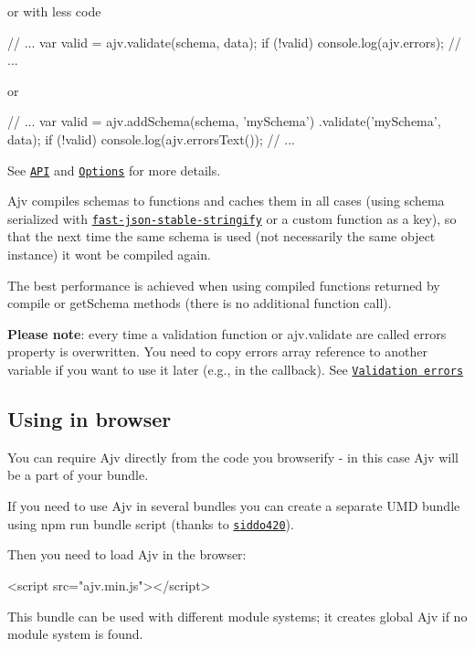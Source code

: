 or with less code


\begin{DoxyCode}
// ...
var valid = ajv.validate(schema, data);
if (!valid) console.log(ajv.errors);
// ...
\end{DoxyCode}


or


\begin{DoxyCode}
// ...
var valid = ajv.addSchema(schema, 'mySchema')
               .validate('mySchema', data);
if (!valid) console.log(ajv.errorsText());
// ...
\end{DoxyCode}


See \href{#api}{\tt A\+PI} and \href{#options}{\tt Options} for more details.

Ajv compiles schemas to functions and caches them in all cases (using schema serialized with \href{https://github.com/epoberezkin/fast-json-stable-stringify}{\tt fast-\/json-\/stable-\/stringify} or a custom function as a key), so that the next time the same schema is used (not necessarily the same object instance) it won\textquotesingle{}t be compiled again.

The best performance is achieved when using compiled functions returned by {\ttfamily compile} or {\ttfamily get\+Schema} methods (there is no additional function call).

{\bfseries Please note}\+: every time a validation function or {\ttfamily ajv.\+validate} are called {\ttfamily errors} property is overwritten. You need to copy {\ttfamily errors} array reference to another variable if you want to use it later (e.\+g., in the callback). See \href{#validation-errors}{\tt Validation errors}

\subsection*{Using in browser}

You can require Ajv directly from the code you browserify -\/ in this case Ajv will be a part of your bundle.

If you need to use Ajv in several bundles you can create a separate U\+MD bundle using {\ttfamily npm run bundle} script (thanks to \href{https://github.com/siddo420}{\tt siddo420}).

Then you need to load Ajv in the browser\+: 
\begin{DoxyCode}
<script src="ajv.min.js"></script>
\end{DoxyCode}


This bundle can be used with different module systems; it creates global {\ttfamily Ajv} if no module system is found.

